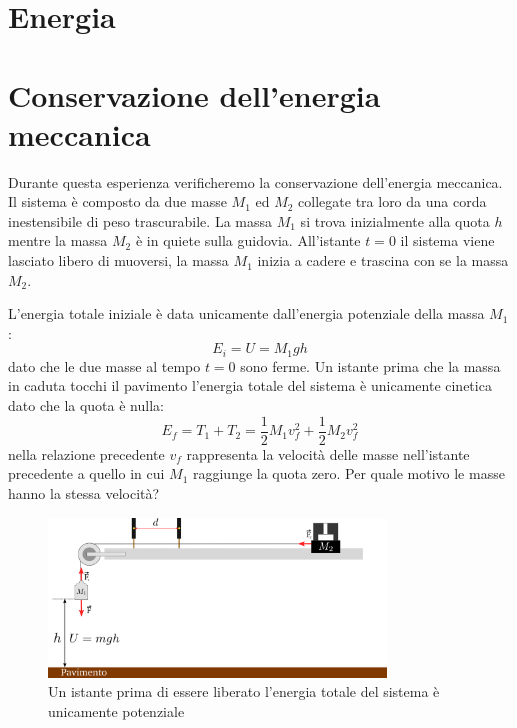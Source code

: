 \documentclass[a4paper,10pt,oneside]{article}
\begin{document}
\thispagestyle{empty}

\section*{Energia}
\vspace{1cm}


\section*{Conservazione dell'energia meccanica}

Durante questa esperienza verificheremo la conservazione dell'energia meccanica. Il sistema è composto da due masse $M_1$ ed $M_2$ collegate tra loro da una corda inestensibile di peso trascurabile. La massa $M_1$ si trova inizialmente alla quota $h$ mentre la massa $M_2$ è in quiete sulla guidovia. All'istante $t=0$ il sistema viene lasciato libero di muoversi, la massa $M_1$ inizia a cadere e trascina con se la massa $M_2$.

L'energia totale iniziale è data unicamente dall'energia potenziale della massa $M_1$:
\begin{equation}
 E_i=U=M_1gh
\end{equation}
dato che le due masse al tempo $t=0$ sono ferme. Un istante prima che la massa in caduta tocchi il pavimento l'energia totale del sistema è unicamente cinetica dato che la quota è  nulla:
\begin{equation}
 E_f=T_1+T_2=\frac 1 2 M_1v_f^2+\frac 1 2 M_2 v_f^2
\end{equation}
nella relazione precedente $v_f$ rappresenta la velocità delle masse nell'istante precedente a quello in cui $M_1$ raggiunge la quota zero. Per quale motivo le masse hanno la stessa velocità?

\begin{figure}[H]
 \centering
 \includegraphics[width=0.8\textwidth]{./immagini/energia_inizio.png}
 \caption{Un istante prima di essere liberato l'energia totale del sistema è unicamente potenziale}
 \label{fig:energia_iniziale}
\end{figure}
\end{document}
